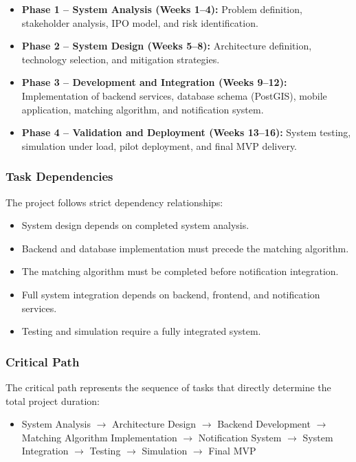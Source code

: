 \documentclass[9pt,conference]{IEEEtran}
\begin{document}
\begin{itemize}
    \item \textbf{Phase 1 – System Analysis (Weeks 1–4):} Problem definition, stakeholder analysis, IPO model, and risk identification.
    
    \item \textbf{Phase 2 – System Design (Weeks 5–8):} Architecture definition, technology selection, and mitigation strategies.
    
    \item \textbf{Phase 3 – Development and Integration (Weeks 9–12):} Implementation of backend services, database schema (PostGIS), mobile application, matching algorithm, and notification system.
    
    \item \textbf{Phase 4 – Validation and Deployment (Weeks 13–16):} System testing, simulation under load, pilot deployment, and final MVP delivery.
\end{itemize}

\subsubsection{Task Dependencies}

The project follows strict dependency relationships:

\begin{itemize}
    \item System design depends on completed system analysis.
    \item Backend and database implementation must precede the matching algorithm.
    \item The matching algorithm must be completed before notification integration.
    \item Full system integration depends on backend, frontend, and notification services.
    \item Testing and simulation require a fully integrated system.
\end{itemize}

\subsubsection{Critical Path}

The critical path represents the sequence of tasks that directly determine the total project duration:

\begin{itemize}
    \item System Analysis $\rightarrow$
    Architecture Design $\rightarrow$
    Backend Development $\rightarrow$
    Matching Algorithm Implementation $\rightarrow$
    Notification System $\rightarrow$
    System Integration $\rightarrow$
    Testing $\rightarrow$
    Simulation $\rightarrow$
    Final MVP
\end{itemize}
\end{document}

